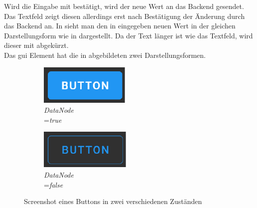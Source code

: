 Wird die Eingabe mit  bestätigt, wird der neue Wert an das Backend gesendet. 
Das Textfeld zeigt diesen allerdings erst nach Bestätigung der Änderung durch das Backend an. 
In  sieht man den in  eingegeben neuen Wert  in der gleichen Darstellungsform wie in  dargestellt.
Da der Text länger ist wie das Textfeld, wird dieser mit \eigenNameNorm{ \dots} abgekürzt.
\\Das \ac{gui} Element  hat die in  abgebildeten zwei Darstellungsformen.
\begin{figure}[ht]
  \centering
  \hspace{0.1\textwidth}
  \begin{subfigure}[h]{0.25\textwidth}
    \centering
    \includegraphics[width=\textwidth]{content/hauptteil/umsetzungPoC/frontend/res/buttonTrue.pdf}
    \caption{\emph{DataNode} \\=\emph{true}}
    \label{fig:frontend:poc:button:true}
  \end{subfigure}
  \hfill
  \begin{subfigure}[h]{0.25\textwidth}
    \centering
    \includegraphics[width=\textwidth]{content/hauptteil/umsetzungPoC/frontend/res/buttonFalse.pdf}
    \caption{\emph{DataNode} \\=\emph{false}}
    \label{fig:frontend:poc:button:false}
  \end{subfigure}
  \hspace{0.1\textwidth}
  \caption[Screenshot, Zustände eines Buttons]{Screenshot eines Buttons in zwei verschiedenen Zuständen}
  \label{fig:frontend:poc:button}
\end{figure}
